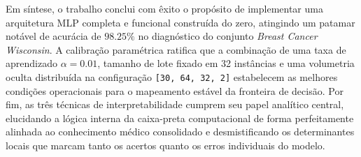 \documentclass[10pt,a4paper]{article}
\begin{document}
Em síntese, o trabalho conclui com êxito o propósito de implementar uma arquitetura MLP completa e funcional construída do zero, atingindo um patamar notável de acurácia de $98.25\%$ no diagnóstico do conjunto \textit{Breast Cancer Wisconsin}. A calibração paramétrica ratifica que a combinação de uma taxa de aprendizado $\alpha=0.01$, tamanho de lote fixado em 32 instâncias e uma volumetria oculta distribuída na configuração \texttt{[30, 64, 32, 2]} estabelecem as melhores condições operacionais para o mapeamento estável da fronteira de decisão. Por fim, as três técnicas de interpretabilidade cumprem seu papel analítico central, elucidando a lógica interna da caixa-preta computacional de forma perfeitamente alinhada ao conhecimento médico consolidado e desmistificando os determinantes locais que marcam tanto os acertos quanto os erros individuais do modelo.
\end{document}
